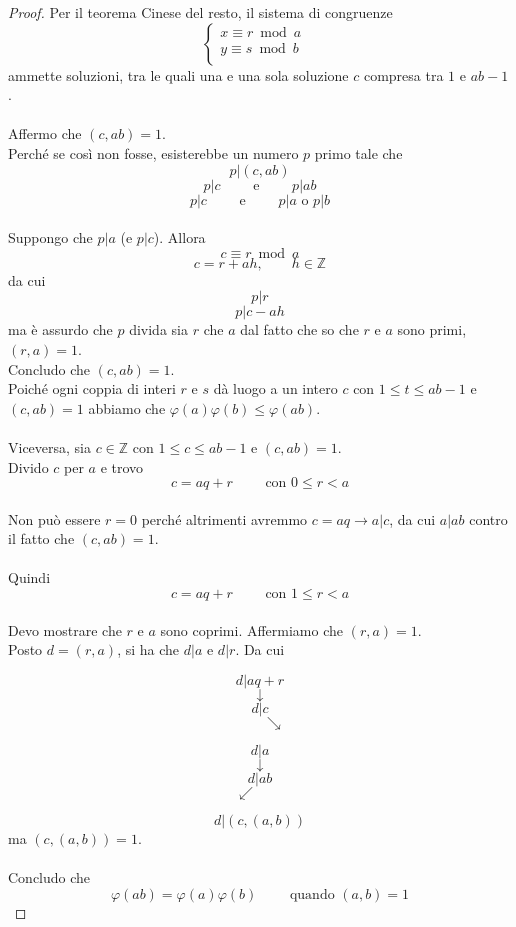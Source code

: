 \documentclass[a4paper,12pt, oneside]{book}
\begin{document}
\begin{enumerate}
\begin{proof}
					Per il teorema Cinese del resto, il sistema di congruenze
					$$\begin{cases}
						x \equiv r \bmod a \\
						y \equiv s \bmod b & \\
					\end{cases}$$
					ammette soluzioni, tra le quali una e una sola soluzione $c$ compresa tra $1$ e $ab-1$.\\\\
					Affermo che $(c,ab)=1$.\\
					Perché se così non fosse, esisterebbe un numero $p$ primo tale che
					$$p|(c,ab)$$
					$$p|c \qquad \mbox{ e } \qquad p|ab$$
					$$p|c \qquad \mbox{ e } \qquad p|a \mbox{ o } p|b$$\\
					Suppongo che $p|a$ (e $p|c$).
					Allora $$c \equiv r \bmod a$$
					$$c = r+ah, \qquad h \in \mathbb{Z}$$
					da cui $$p|r$$ $$p|c-ah$$ ma è assurdo che $p$ divida sia $r$ che $a$ dal fatto che so che $r$ e $a$ sono primi, $(r,a)=1$.\\
					Concludo che $(c,ab)=1$.\\
					Poiché ogni coppia di interi $r$ e $s$ dà luogo a un intero $c$ con $1 \leq t \leq ab-1$ e $(c,ab)=1$ abbiamo che $\varphi(a)\varphi(b) \leq \varphi(ab).$
					\\\\
					Viceversa, sia $c \in \mathbb{Z}$ con $1 \leq c \leq ab-1$ e $(c,ab)=1$.\\
					Divido $c$ per $a$ e trovo
					$$c = aq+r \qquad \mbox{ con } 0 \leq r < a$$\\
					Non può essere $r=0$ perché altrimenti avremmo $c = aq \rightarrow a|c$, da cui $a|ab$ contro il fatto che $(c,ab)=1$.\\\\
					Quindi
					$$c = aq+r \qquad \mbox{ con } 1 \leq r < a$$\\
					Devo mostrare che $r$ e $a$ sono coprimi. Affermiamo che $(r,a)=1$.\\
					Posto $d = (r,a)$, si ha che $d|a$ e $d|r$. Da cui
							
					\begin{minipage}{0.45\textwidth}
						$$d|aq+r$$
						$$\downarrow$$
						$$d|c$$
						$$\qquad \searrow$$
					\end{minipage}%
					\hfill
					\begin{minipage}{0.45\textwidth}
						$$d|a$$
						$$\downarrow$$
						$$d|ab$$
						$$\swarrow \qquad$$
					\end{minipage}%
					
					$$d|(c, (a,b))$$
					ma $(c, (a,b)) = 1$.\\\\
					Concludo che $$\varphi(ab)=\varphi(a)\varphi(b) \qquad \mbox{ quando } (a,b)=1$$
					
				\end{proof}
				
		\end{enumerate}
		
\end{document}
